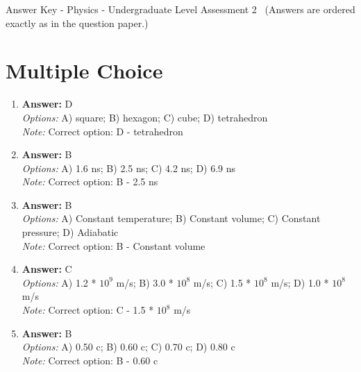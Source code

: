 \documentclass[12pt]{article}
\begin{document}
\begin{center}
Answer Key - Physics - Undergraduate Level Assessment 2 \
\small (Answers are ordered exactly as in the question paper.)
\end{center}

\section*{Multiple Choice}
\begin{enumerate}[label=\arabic*.]
\item \textbf{Answer:} D
\\ \textit{Options:} A) square; B) hexagon; C) cube; D) tetrahedron
\\ \textit{Note:} Correct option: D - tetrahedron
\item \textbf{Answer:} B
\\ \textit{Options:} A) 1.6 ns; B) 2.5 ns; C) 4.2 ns; D) 6.9 ns
\\ \textit{Note:} Correct option: B - 2.5 ns
\item \textbf{Answer:} B
\\ \textit{Options:} A) Constant temperature; B) Constant volume; C) Constant pressure; D) Adiabatic
\\ \textit{Note:} Correct option: B - Constant volume
\item \textbf{Answer:} C
\\ \textit{Options:} A) 1.2 * $10^9$ m/s; B) 3.0 * $10^8$ m/s; C) 1.5 * $10^8$ m/s; D) 1.0 * $10^8$ m/s
\\ \textit{Note:} Correct option: C - 1.5 * $10^8$ m/s
\item \textbf{Answer:} B
\\ \textit{Options:} A) 0.50 c; B) 0.60 c; C) 0.70 c; D) 0.80 c
\\ \textit{Note:} Correct option: B - 0.60 c
\end{enumerate}
\end{document}

